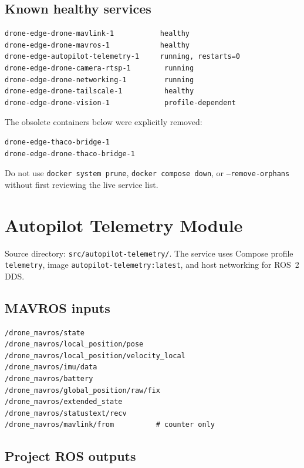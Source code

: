 \documentclass[11pt,a4paper]{article}
\newcommand{\pathtext}[1]{\texttt{#1}}
\begin{document}
\subsection{Known healthy services}

\begin{lstlisting}
drone-edge-drone-mavlink-1           healthy
drone-edge-drone-mavros-1            healthy
drone-edge-autopilot-telemetry-1     running, restarts=0
drone-edge-drone-camera-rtsp-1        running
drone-edge-drone-networking-1         running
drone-edge-drone-tailscale-1          healthy
drone-edge-drone-vision-1             profile-dependent
\end{lstlisting}

The obsolete containers below were explicitly removed:

\begin{lstlisting}
drone-edge-thaco-bridge-1
drone-edge-drone-thaco-bridge-1
\end{lstlisting}

Do not use \pathtext{docker system prune}, \pathtext{docker compose down}, or
\pathtext{--remove-orphans} without first reviewing the live service list.

\section{Autopilot Telemetry Module}

Source directory: \pathtext{src/autopilot-telemetry/}. The service uses Compose
profile \pathtext{telemetry}, image \pathtext{autopilot-telemetry:latest}, and
host networking for ROS~2 DDS.

\subsection{MAVROS inputs}

\begin{lstlisting}
/drone_mavros/state
/drone_mavros/local_position/pose
/drone_mavros/local_position/velocity_local
/drone_mavros/imu/data
/drone_mavros/battery
/drone_mavros/global_position/raw/fix
/drone_mavros/extended_state
/drone_mavros/statustext/recv
/drone_mavros/mavlink/from          # counter only
\end{lstlisting}

\subsection{Project ROS outputs}
\end{document}
